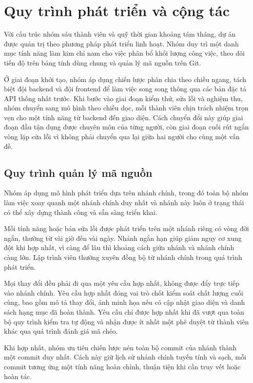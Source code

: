 \documentclass[12pt,a4paper,oneside]{report}
\begin{document}
\section{Quy trình phát triển và cộng tác}

Với cấu trúc nhóm sáu thành viên và quỹ thời gian khoảng tám tháng, dự án được quản trị theo phương pháp phát triển linh hoạt. Nhóm duy trì một danh mục tính năng làm kim chỉ nam cho việc phân bổ khối lượng công việc, theo dõi tiến độ trên bảng tính dùng chung và quản lý mã nguồn trên Git.

Ở giai đoạn khởi tạo, nhóm áp dụng chiến lược phân chia theo chiều ngang, tách biệt đội backend và đội frontend để làm việc song song thông qua các bản đặc tả API thống nhất trước. Khi bước vào giai đoạn kiểm thử, sửa lỗi và nghiệm thu, nhóm chuyển sang mô hình theo chiều dọc, mỗi thành viên chịu trách nhiệm trọn vẹn cho một tính năng từ backend đến giao diện. Cách chuyển đổi này giúp giai đoạn đầu tận dụng được chuyên môn của từng người, còn giai đoạn cuối rút ngắn vòng lặp sửa lỗi vì không phải chuyển qua lại giữa hai người cho cùng một vấn đề.

\subsection{Quy trình quản lý mã nguồn}

Nhóm áp dụng mô hình phát triển dựa trên nhánh chính, trong đó toàn bộ nhóm làm việc xoay quanh một nhánh chính duy nhất và nhánh này luôn ở trạng thái có thể xây dựng thành công và sẵn sàng triển khai.

Mỗi tính năng hoặc bản sửa lỗi được phát triển trên một nhánh riêng có vòng đời ngắn, thường từ vài giờ đến vài ngày. Nhánh ngắn hạn giúp giảm nguy cơ xung đột khi hợp nhất, vì càng để lâu thì khoảng cách giữa nhánh và nhánh chính càng lớn. Lập trình viên thường xuyên đồng bộ từ nhánh chính trong quá trình phát triển.

Mọi thay đổi đều phải đi qua một yêu cầu hợp nhất, không được đẩy trực tiếp vào nhánh chính. Yêu cầu hợp nhất đóng vai trò chốt kiểm soát chất lượng cuối cùng, bao gồm mô tả thay đổi, ảnh minh họa nếu có cập nhật giao diện và danh sách hạng mục đã hoàn thành. Yêu cầu chỉ được hợp nhất khi đã vượt qua toàn bộ quy trình kiểm tra tự động và nhận được ít nhất một phê duyệt từ thành viên khác qua quá trình đánh giá mã chéo.

Khi hợp nhất, nhóm ưu tiên chiến lược nén toàn bộ commit của nhánh thành một commit duy nhất. Cách này giữ lịch sử nhánh chính tuyến tính và sạch, mỗi commit tương ứng một tính năng hoàn chỉnh, thuận tiện khi cần truy vết hoặc hoàn tác.
\end{document}
